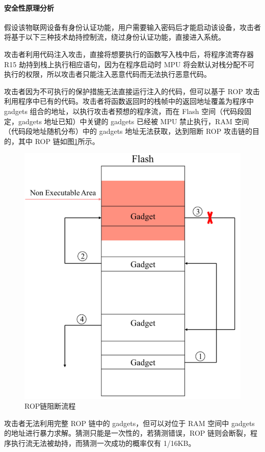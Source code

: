 \documentclass[12pt,a4paper]{ctexart}
\numberwithin{figure}{section}
\begin{document}
\paragraph{安全性原理分析}
\par 假设该物联网设备有身份认证功能，用户需要输入密码后才能启动该设备，攻击者将基于以下三种技术劫持控制流，绕过身份认证功能，直接进入系统。
\par 攻击者利用代码注入攻击，直接将想要执行的函数写入栈中后，将程序流寄存器R15 劫持到栈上执行相应语句，因为在程序启动时 MPU 将会默认对栈分配不可执行的权限，所以攻击者只能注入恶意代码而无法执行恶意代码。
\par 攻击者因为不可执行的保护措施无法直接运行注入的代码，但可以基于 ROP 攻击利用程序中已有的代码。攻击者将函数返回时的栈帧中的返回地址覆盖为程序中gadgets 组合的地址，以执行攻击者预想的程序流，而在 Flash 空间（代码段固定，gadgets 地址已知）中关键的 gadgets 已经被 MPU 禁止执行，RAM 空间（代码段地址随机分布）中的 gadgets 地址无法获取，达到阻断 ROP 攻击链的目的，其中 ROP 链如图\ref{ROP blocking process}所示。
\begin{figure}
    \centering
    \includegraphics[scale=0.3]{graph/ROP blocking process.png}
    \caption{ROP链阻断流程}
    \label{ROP blocking process}
\end{figure}
\par 攻击者无法利用完整 ROP 链中的 gadgets，但可以对位于 RAM 空间中 gadgets 的地址进行暴力求解。猜测只能是一次性的，若猜测错误，ROP 链则会断裂，程序执行流无法被劫持，而猜测一次成功的概率仅有 1/16KB。
\end{document}
